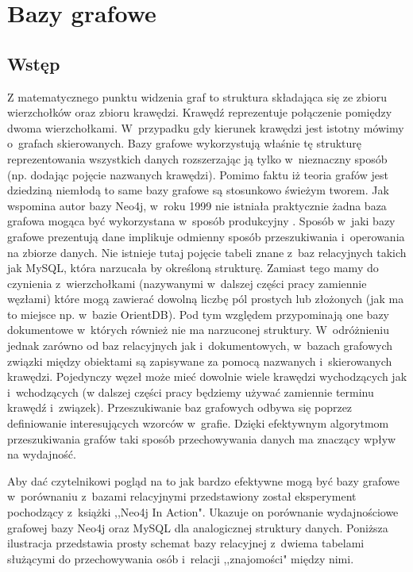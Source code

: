 \documentclass{xmgr}
\begin{document}
\chapter{Bazy grafowe}

\section{Wstęp}

Z matematycznego punktu widzenia\cite{Szepietowski:2010:MD} graf to struktura składająca się ze zbioru wierzchołków oraz zbioru krawędzi. Krawędź reprezentuje połączenie pomiędzy dwoma wierzchołkami. W~przypadku gdy kierunek krawędzi jest istotny mówimy o~grafach skierowanych. Bazy grafowe wykorzystują właśnie tę strukturę reprezentowania wszystkich danych rozszerzając ją tylko w~nieznaczny sposób (np. dodając pojęcie nazwanych krawędzi). Pomimo faktu iż teoria grafów jest dziedziną niemłodą to same bazy grafowe są stosunkowo świeżym tworem. Jak wspomina autor bazy Neo4j, w~roku 1999 nie istniała praktycznie żadna baza grafowa mogąca być wykorzystana w~sposób produkcyjny \cite{Robinson:2013:GD}. Sposób w~jaki bazy grafowe prezentują dane implikuje odmienny sposób przeszukiwania i~operowania na zbiorze danych. Nie istnieje tutaj pojęcie tabeli znane z~baz relacyjnych takich jak MySQL, która narzucała by określoną strukturę. Zamiast tego mamy do czynienia z~wierzchołkami (nazywanymi w~dalszej części pracy zamiennie węzłami) które mogą zawierać dowolną liczbę pól prostych lub złożonych (jak ma to miejsce np. w~bazie OrientDB). Pod tym względem przypominają one bazy dokumentowe w~których również nie ma narzuconej struktury. W~odróżnieniu jednak zarówno od baz relacyjnych jak i~dokumentowych, w~bazach grafowych związki między obiektami są zapisywane za pomocą nazwanych i~skierowanych krawędzi. Pojedynczy węzeł może mieć dowolnie wiele krawędzi wychodzących jak i~wchodzących (w dalszej części pracy będziemy używać zamiennie terminu krawędź i~związek). Przeszukiwanie baz grafowych odbywa się poprzez definiowanie interesujących wzorców w~grafie. Dzięki efektywnym algorytmom przeszukiwania grafów taki sposób przechowywania danych ma znaczący wpływ na wydajność.

Aby dać czytelnikowi pogląd na to jak bardzo efektywne mogą być bazy grafowe w~porównaniu z~bazami relacyjnymi przedstawiony został eksperyment pochodzący z~książki ,,Neo4j In Action"\cite{neo4jinaction}. Ukazuje on porównanie wydajnościowe grafowej bazy Neo4j oraz MySQL dla analogicznej struktury danych. Poniższa ilustracja przedstawia prosty schemat bazy relacyjnej z~dwiema tabelami służącymi do przechowywania osób i~relacji ,,znajomości" między nimi.
\end{document}
